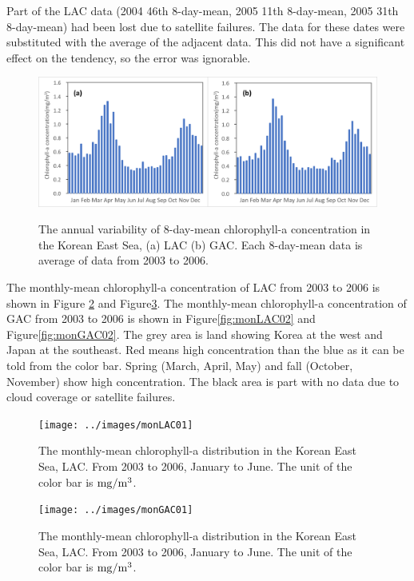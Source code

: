 Part of the LAC data (2004 46th 8-day-mean, 2005 11th 8-day-mean, 2005 31th 8-day-mean) had been lost due to satellite failures. The data for these dates were substituted with the average of the adjacent data. This did not have a significant effect on the tendency, so the error was ignorable.
  
 \begin{figure}[b]
	\centering
	\includegraphics[width=0.8\linewidth]{../images/annualwky}\\
	\caption{The annual variability of 8-day-mean chlorophyll-a concentration in the Korean East Sea, (a) LAC (b) GAC. Each 8-day-mean data is average of data from 2003 to 2006.}
	\label{fig:annualwky}
\end{figure}

  
 
The monthly-mean chlorophyll-a concentration of LAC from 2003 to 2006 is shown in Figure \ref{fig:monLAC01} and Figure\ref{fig:monGAC01}. The monthly-mean chlorophyll-a concentration of GAC from 2003 to 2006 is shown in Figure\ref{fig:monLAC02} and Figure\ref{fig:monGAC02}. The grey area is land showing Korea at the west and Japan at the southeast. Red means high concentration than the blue as it can be told from the color bar. Spring (March, April, May) and fall (October, November) show high concentration. The black area is part with no data due to cloud coverage or satellite failures. 

\begin{figure}[t]
	\centering
	\texttt{[image: ../images/monLAC01]}\\
	\caption{The monthly-mean chlorophyll-a distribution in the Korean East Sea, LAC. From 2003 to 2006, January to June. The unit of the color bar is $\rm mg/m^3$.}
	\label{fig:monLAC01}
\end{figure}
    
\begin{figure}[p]
	\centering
	\texttt{[image: ../images/monGAC01]}\\
	\caption{The monthly-mean chlorophyll-a distribution in the Korean East Sea, LAC. From 2003 to 2006, January to June. The unit of the color bar is $\rm mg/m^3$.}
	\label{fig:monGAC01}
\end{figure}



